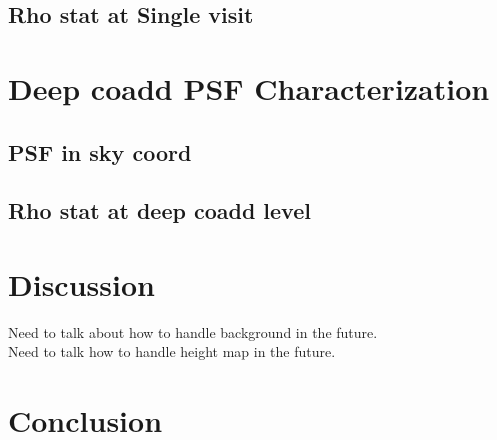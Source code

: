 \subsection{Rho stat at Single visit}



\section{Deep coadd PSF Characterization}

\subsection{PSF in sky coord}

\subsection{Rho stat at deep coadd level}

\section{Discussion}\label{sec:discussion}

Need to talk about how to handle background in the future. \\
Need to talk how to handle height map in the future.


\section{Conclusion}

